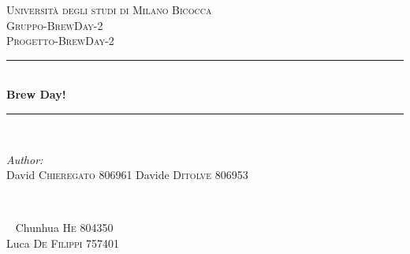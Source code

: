 \documentclass[12pt]{article}
\begin{document}
\begin{titlepage}

\newcommand{\HRule}{\rule{\linewidth}{0.5mm}} %

\center %
 

\textsc{\LARGE Università degli studi di Milano Bicocca}\\[1.5cm] %
\textsc{\Large Gruppo-BrewDay-2}\\[0.5cm] %
\textsc{\large Progetto-BrewDay-2}\\[0.5cm] %


\HRule \\[0.4cm]
{ \huge \bfseries Brew Day!}\\[0.4cm] %
\HRule \\[1.5cm]
 

\begin{minipage}{0.45\textwidth}
\begin{flushleft} \large
\emph{Author:}\\
David \textsc{Chieregato} 806961 %
Davide \textsc{Ditolve} 806953
\end{flushleft}
\end{minipage}
~
\begin{minipage}{0.45\textwidth}
\begin{flushright} \large
~\newline
Chunhua \textsc{He} 804350\\
Luca \textsc{De Filippi} 757401\\
\end{flushright}
\end{minipage}\\[2cm]


\end{titlepage}
\end{document}
